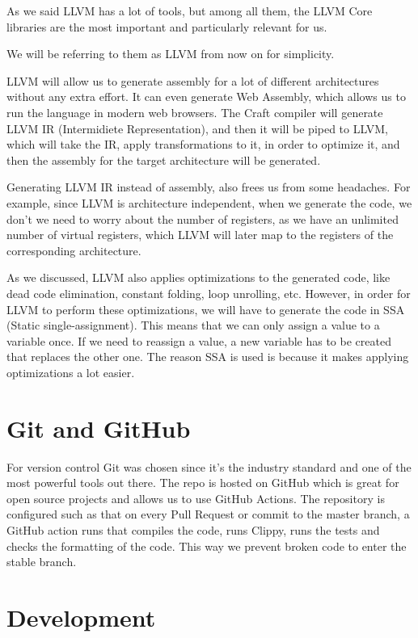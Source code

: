 ﻿\documentclass[10pt,a4paper,twocolumn,twoside]{article}
\begin{document}
As we said LLVM has a lot of tools, but among all them, the LLVM Core libraries
are the most important and particularly relevant for us. 

We will be referring to 
them as LLVM from now on for simplicity. 

LLVM will allow us to generate assembly for a lot of different architectures
without any extra effort. It can even generate Web Assembly, which allows us to
run the language in modern web browsers. The Craft compiler will generate LLVM
IR (Intermidiete Representation), and then it will be piped to LLVM, which will
take the IR, apply transformations to it, in order to optimize it, and then
the assembly for the target architecture will be generated.

Generating LLVM IR instead of assembly, also frees us from some headaches. For
example, since LLVM is architecture independent, when we generate the code, we
don't we need to worry about the number of registers, as we have an unlimited
number of virtual registers, which LLVM will later map to the registers of the
corresponding architecture.

As we discussed, LLVM also applies optimizations to the generated code, like
dead code elimination, constant folding, loop unrolling, etc. However, in order
for LLVM to perform these optimizations, we will have to generate the code in
SSA (Static single-assignment). This means that we can only assign a value to a
variable once. If we need to reassign a value, a new variable has to be created
that replaces the other one. The reason SSA is used is because it makes 
applying optimizations a lot easier.

\section{Git and GitHub}
For version control Git was chosen since it's the industry standard and one of
the most powerful tools out there. The repo is hosted on GitHub which is great
for open source projects and allows us to use GitHub Actions. The repository is 
configured such as that on every Pull Request or commit to the master branch,
a GitHub action runs that compiles the code, runs Clippy, runs the tests and 
checks the formatting of the code. This way we prevent broken code to enter the
stable branch.

\section{Development}
\end{document}
